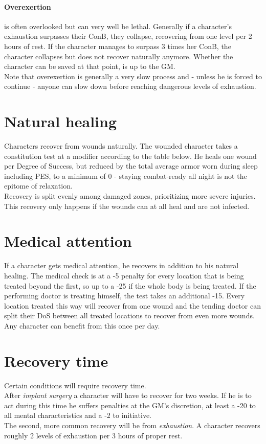 \documentclass[12pt,a4paper,openany,usenames,dvipsnames]{book}
\begin{document}
	\paragraph{Overexertion} is often overlooked but can very well be lethal. Generally if a character’s exhaustion surpasses their ConB, they collapse, recovering from one level per 2 hours of rest. If the character manages to surpass 3 times her ConB, the character collapses but does not recover naturally anymore. Whether the character can be saved at that point, is up to the GM.\\
	Note that overexertion is generally a very slow process and - unless he is forced to continue - anyone can slow down before reaching dangerous levels of exhaustion.
	\section{Natural healing}
	Characters recover from wounds naturally. The wounded character takes a constitution test at a modifier according to the table below. He heals one wound per Degree of Success, but reduced by the total average armor worn during sleep including PES, to a minimum of 0 - staying combat-ready all night is not the epitome of relaxation.\\
	Recovery is split evenly among damaged zones, prioritizing more severe injuries. This recovery only happens if the wounds can at all heal and are not infected.
	\section{Medical attention}
	If a character gets medical attention, he recovers in addition to his natural healing. The medical check is at a -5 penalty for every location that is being treated beyond the first, so up to a -25 if the whole body is being treated. If the performing doctor is treating himself, the test takes an additional \mbox{-15}. %
	Every location treated this way will recover from one wound and the tending doctor can split their DoS between all treated locations to recover from even more wounds. Any character can benefit from this once per day.
	\section{Recovery time}
	Certain conditions will require recovery time.\\
	After \emph{implant surgery} a character will have to recover for two weeks. If he is to act during this time he suffers penalties at the GM’s discretion, at least a -20 to all mental characteristics and a -2 to initiative.\\
	The second, more common recovery will be from \emph{exhaustion}. A character recovers roughly 2 levels of exhaustion per 3 hours of proper rest.
\end{document}
